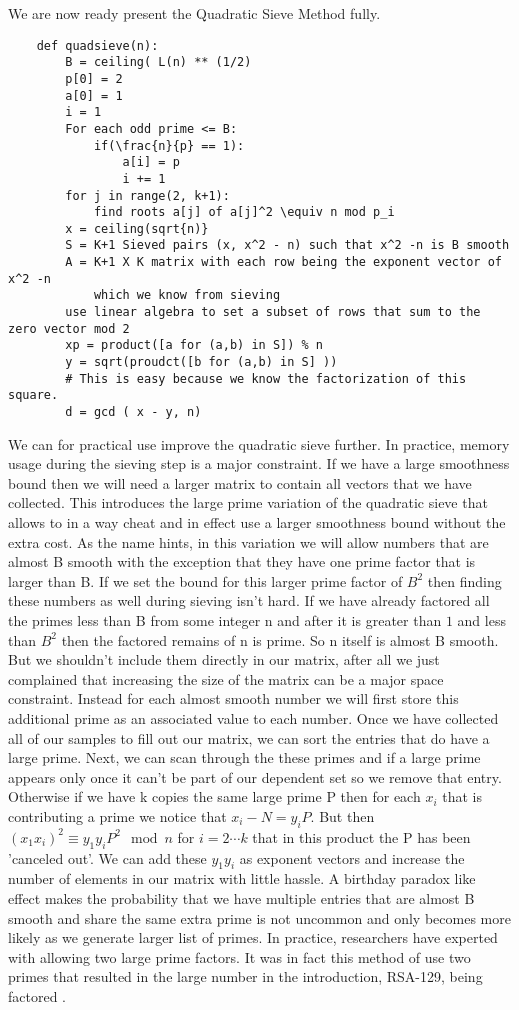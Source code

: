 \documentclass{article}
\begin{document}
We are now ready present the Quadratic Sieve Method fully. 
\begin{verbatim}
    def quadsieve(n):
        B = ceiling( L(n) ** (1/2)
        p[0] = 2
        a[0] = 1
        i = 1
        For each odd prime <= B:
            if(\frac{n}{p} == 1):
                a[i] = p
                i += 1
        for j in range(2, k+1):
            find roots a[j] of a[j]^2 \equiv n mod p_i
        x = ceiling(sqrt{n)}
        S = K+1 Sieved pairs (x, x^2 - n) such that x^2 -n is B smooth
        A = K+1 X K matrix with each row being the exponent vector of x^2 -n
            which we know from sieving
        use linear algebra to set a subset of rows that sum to the zero vector mod 2
        xp = product([a for (a,b) in S]) % n
        y = sqrt(proudct([b for (a,b) in S] )) 
        # This is easy because we know the factorization of this square.
        d = gcd ( x - y, n)
\end{verbatim}
We can for practical use improve the quadratic sieve further.  In practice, memory usage during the sieving step is a major constraint. If we have a large smoothness bound then we will need a larger matrix to contain all vectors that we have collected.  This introduces the large prime variation of the quadratic sieve that allows to in a way cheat and in effect use a larger smoothness bound without the extra cost.  As the name hints, in this variation we will allow numbers that are almost B smooth with the exception that they have one prime factor that is larger than B. If we set the bound for this larger prime factor of $B^2$ then finding these numbers as well during sieving isn't hard. If we have already factored all the primes less than B from some integer n and after it is greater than $1$ and less than $B^2$ then the factored remains of n is prime. So n itself is almost B smooth. But we shouldn't include them directly in our matrix, after all we just complained that increasing the size of the matrix can be a major space constraint. Instead for each almost smooth number we will first store this additional prime as an associated value to each number. Once we have collected all of our samples to fill out our matrix, we can sort the entries that do have a large prime. Next, we can scan through the these primes and if a large prime appears only once it can't be part of our dependent set so we remove that entry. Otherwise if we have k copies the same large prime P then for each $x_i$ that is contributing a prime we notice that $x_i - N = y_i P$. But then $(x_1 x_i)^2 \equiv y_1 y_i P^2 \mod n$ for $i = 2 \cdots k$ that in this product the P has been 'canceled out'. We can add these $y_1 y_i$ as exponent vectors and increase the number of elements in our matrix with little hassle. A birthday paradox like effect makes the probability that we have multiple entries that are almost B smooth and share the same extra prime is not uncommon and only  becomes more likely as we generate larger list of primes. In practice, researchers have experted with allowing two large prime factors. It was in fact this method of use two primes that resulted in the large number in the introduction, RSA-129, being factored \cite{atkins1994magic}. 
\end{document}
